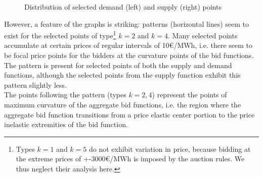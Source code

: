 \begin{figure}[!ht]
\caption{Distribution of selected demand (left) and supply (right) points}
\label{patternsgraph}
\end{figure}


However, a feature of the graphs is striking: patterns (horizontal lines) seem to exist for the selected points of type\footnote{Types $k=1$ and $k=5$ do not exhibit variation in price, because bidding at the extreme prices of  +-3000\euro{}/MWh is imposed by the auction rules. We thus neglect their analysis here.} $k=2$ and $k=4$. Many selected points accumulate at certain prices of regular intervals of 10\euro{}/MWh, i.e. there seem to be focal price points for the bidders at the curvature points of the bid functions. The pattern is present for selected points of both the supply and demand functions, although the selected points from the supply function exhibit this pattern slightly less. \\

The points following the pattern (types $k=2,4$) represent the points of maximum curvature of the aggregate bid functions, i.e. the region where the aggregate bid function transitions from a price elastic center portion to the price inelastic extremities of the bid function. \\

